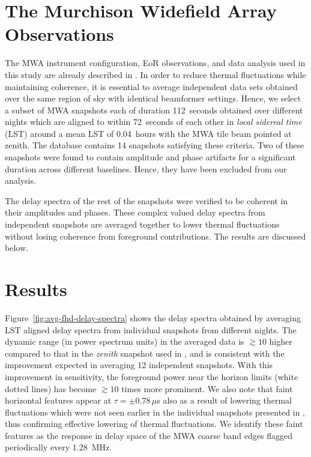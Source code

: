 \documentclass[preprint2,apjl,numberedappendix,twocolappendix,appendixfloats]{emulateapj}
\begin{document}
\section{The Murchison Widefield Array Observations}\label{sec:MWA}

The MWA instrument configuration, EoR observations, and data analysis used in this study are already described in \citet{thy15}. In order to reduce thermal fluctuations while maintaining coherence, it is essential to average independent data sets obtained over the same region of sky with identical beamformer settings. Hence, we select a subset of MWA snapshots each of duration 112~seconds obtained over different nights which are aligned to within 72~seconds of each other in {\it local sidereal time} (LST) around a mean LST of 0.04~hours with the MWA tile beam pointed at zenith. The database contains 14 snapshots satisfying these criteria. Two of these snapshots were found to contain amplitude and phase artifacts for a significant duration across different baselines. Hence, they have been excluded from our analysis. 

The delay spectra of the rest of the snapshots were verified to be coherent in their amplitudes and phases. These complex valued delay spectra from independent snapshots are averaged together to lower thermal fluctuations without losing coherence from foreground contributions. The results are discussed below.

\section{Results}\label{sec:results}

Figure~\ref{fig:avg-fhd-delay-spectra} shows the delay spectra obtained by averaging LST aligned delay spectra from individual snapshots from different nights. The dynamic range (in power spectrum units) in the averaged data is $\gtrsim 10$ higher compared to that in the {\it zenith} snapshot used in \citet{thy15}, and is consistent with the improvement expected in averaging 12 independent snapshots. With this improvement in sensitivity, the foreground power near the horizon limits (white dotted lines) has become $\gtrsim 10$ times more prominent. We also note that faint horizontal features appear at $\tau = \pm 0.78\,\mu$s also as a result of lowering thermal fluctuations which were not seen earlier in the individual snapshots presented in \citet{thy15}, thus confirming effective lowering of thermal fluctuations. We identify these faint features as the response in delay space of the MWA coarse band edges flagged periodically every 1.28~MHz. 
\end{document}
